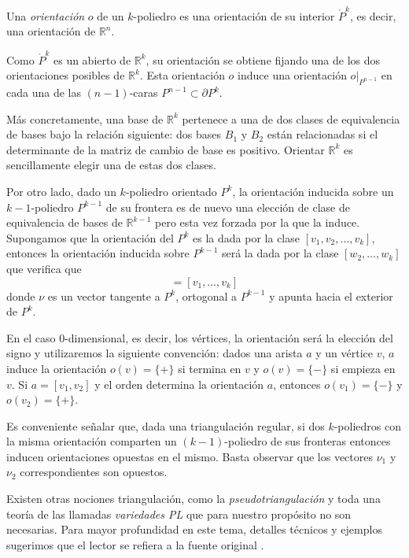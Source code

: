 \begin{definition}
    Una \textit{orientación} $o$ de un $k$-poliedro es una orientación de su interior $\mathring{P}^k$, es decir, una orientación de $\mathbb{R}^n$.
\end{definition}

Como $\mathring{P}^k$ es un abierto de $\mathbb{R}^k$, su orientación se obtiene fijando una de los dos orientaciones posibles de $\mathbb{R}^k$. Esta orientación $o$ induce una orientación $o|_{P^{n-1}}$ en cada una de las $(n-1)$-caras $P^{n-1}\subset \partial P^k$.

Más concretamente, una base de $\mathbb{R}^k$ pertenece a una de dos clases de equivalencia de bases bajo la relación siguiente: dos bases $B_1$ y $B_2$ están relacionadas si el determinante de la matriz de cambio de base es positivo. Orientar $\mathbb{R}^k$ es sencillamente elegir una de estas dos clases.

Por otro lado, dado un $k$-poliedro orientado $P^k$, la orientación inducida sobre un $k-1$-poliedro $P^{k-1}$ de su frontera es de nuevo una elección de clase de equivalencia de bases de $\mathbb{R}^{k-1}$ pero esta vez forzada por la que la induce. Supongamos que la orientación del $P^k$ es la dada por la clase $[v_1,v_2,\dots, v_k]$, entonces la orientación inducida sobre $P^{k-1}$ será la dada por la clase $[w_2,\dots,w_k]$ que verifica que
\begin{equation*}
    [\nu, w_2,\dots, w_k] = [v_1,\dots,v_k]
\end{equation*}
donde $\nu$ es un vector tangente a $P^k$, ortogonal a $P^{k-1}$ y apunta hacia el exterior de $P^k$.

En el caso $0$-dimensional, es decir, los vértices, la orientación será la elección del signo y utilizaremos la siguiente convención: dados una arista $a$ y un vértice $v$, $a$ induce la orientación $o(v)=\{+\}$ si termina en $v$ y $o(v)=\{-\}$ si empieza en $v$. Si $a=[v_1,v_2]$ y el orden determina la orientación $a$, entonces $o(v_1)=\{-\}$ y $o(v_2)=\{+\}$.

Es conveniente señalar que, dada una triangulación regular, si dos $k$-poliedros con la misma orientación comparten un $(k-1)$-poliedro de sus fronteras entonces inducen orientaciones opuestas en el mismo. Basta observar que los vectores $\nu_1$ y $\nu_2$ correspondientes son opuestos.

Existen otras nociones triangulación, como la \textit{pseudotriangulación} y toda una teoría de las llamadas \textit{variedades PL} que para nuestro propósito no son necesarias. Para mayor profundidad en este tema, detalles técnicos y ejemplos sugerimos que el lector se refiera a la fuente original \cite{munoz2021}.

